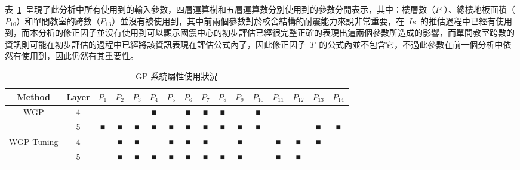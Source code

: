 表~\ref{tab:gp-attributes}~呈現了此分析中所有使用到的輸入參數，四層運算樹和五層運算數分別使用到的參數分開表示，其中：樓層數（$P_1$）、總樓地板面積（$P_{10}$）和單間教室的跨數（$P_{13}$）並沒有被使用到，其中前兩個參數對於校舍結構的耐震能力來說非常重要，在~$Is$~的推估過程中已經有使用到，而本分析的修正因子並沒有使用到可以顯示國震中心的初步評估已經很完整正確的表現出這兩個參數所造成的影響，而單間教室跨數的資訊則可能在初步評估的過程中已經將該資訊表現在評估公式內了，因此修正因子~$T$~的公式內並不包含它，不過此參數在前一個分析中依然有使用到，因此仍然有其重要性。

{\renewcommand{\arraystretch}{1.5}
\begin{table}[hbtp]
  \begin{center}
    \caption{GP 系統屬性使用狀況}
    \label{tab:gp-attributes}
    \scriptsize
    \begin{tabular}{c c c c c c c c c c c c c c c c}
      \hline
      Method & Layer & $P_1$ & $P_2$ & $P_3$ & $P_4$ & $P_5$ & $P_6$ & $P_7$ & $P_8$ & $P_9$ & $P_{10}$ & $P_{11}$ & $P_{12}$ & $P_{13}$ & $P_{14}$ \\
      \hline
      \multirow{2}{*}{WGP} & 4  &  &  &  & ■ &  & ■ & ■ & ■ &  & ■ &  &  &  &  \\
       & 5  & ■ & ■ & ■ & ■ & ■ & ■ & ■ & ■ & ■ & ■ &  &  & ■ & ■ \\
      \multirow{2}{*}{WGP Tuning} & 4 &  & ■ & ■ &  & ■ & ■ & ■ &  & ■ &  & ■ & ■ & ■ &  \\
       & 5  &  & ■ & ■ & ■ & ■ & ■ & ■ & ■ & ■ &  & ■ & ■ &  &  \\
      \hline
      \end{tabular}
  \end{center}
\end{table}
}




